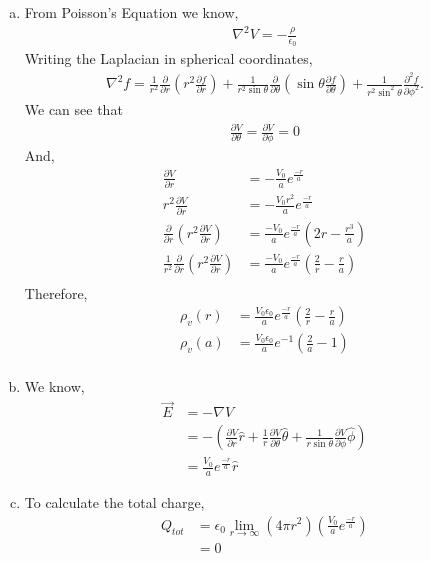 \begin{problem}{}{}
    \begin{enumerate}[(a)]
        \item From Poisson's Equation we know, 
        \begin{align*}
            \mathbb{\nabla}^2V = -\frac{\rho}{\epsilon_0}
        \end{align*}
        Writing the Laplacian in spherical coordinates, 
        \begin{align*}
\nabla^2 f = \frac{1}{r^2} \frac{\partial}{\partial r} \left( r^2 \frac{\partial f}{\partial r} \right)
+ \frac{1}{r^2 \sin\theta} \frac{\partial}{\partial \theta} \left( \sin\theta \frac{\partial f}{\partial \theta} \right)
+ \frac{1}{r^2 \sin^2\theta} \frac{\partial^2 f}{\partial \phi^2}.
        \end{align*}
        We can see that
        \begin{align*}
            \frac{\partial V}{\partial \theta} = \frac{\partial V}{\partial \phi} = 0
        \end{align*}
        And, 
        \begin{align*}
            \frac{\partial V}{\partial r} &= -\frac{V_0}{a}e^{\frac{-r}{a}}\\
            r^2\frac{\partial V}{\partial r} &= -\frac{V_0r^2}{a}e^{\frac{-r}{a}}\\
            \frac{\partial}{\partial r}\left(r^2\frac{\partial V}{\partial r}\right)&= \frac{-V_0}{a}e^{\frac{-r}{a}}\left(2r -\frac{r^3}{a}\right)\\
            \frac{1}{r^2}\frac{\partial}{\partial r}\left(r^2\frac{\partial V}{\partial r}\right)&= \frac{-V_0}{a}e^{\frac{-r}{a}}\left(\frac{2}{r} -\frac{r}{a}\right)\\
        \end{align*}
        Therefore,
        \begin{align*}
            \rho_v(r) &=  \frac{V_0\epsilon_0}{a}e^{\frac{-r}{a}}\left(\frac{2}{r} -\frac{r}{a}\right)\\
            \rho_v(a) &=  \frac{V_0\epsilon_0}{a}e^{-1}\left(\frac{2}{a} -1 \right)\\
        \end{align*}
        \item We know, 
        \begin{align*}
            \vec{E} &= -\mathbb{\nabla}V\\
            &= -\left( \frac{\partial V}{\partial r} \hat{r} + \frac{1}{r} \frac{\partial V}{\partial \theta} \hat{\theta} + \frac{1}{r \sin\theta} \frac{\partial V}{\partial \phi} \hat{\phi}\right)\\
            &= \frac{V_0}{a}e^{\frac{-r}{a}} \hat{r}
        \end{align*}
        \item To calculate the total charge, 
        \begin{align*}
            Q_{tot} &= \epsilon_0 \lim_{r \rightarrow \infty} \left(4\pi r^2\right)\left(\frac{V_0}{a}e^{\frac{-r}{a}}\right)\\
            &=0
        \end{align*}
    \end{enumerate}
\end{problem}
